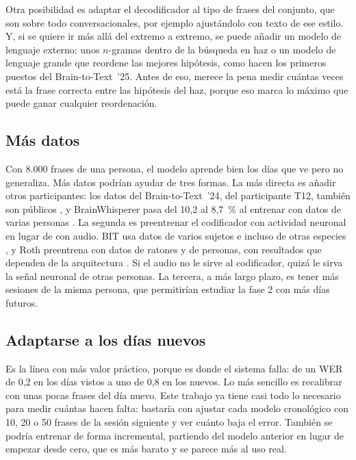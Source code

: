 Otra posibilidad es adaptar el decodificador al tipo de frases del conjunto, que son sobre todo conversacionales, por ejemplo ajustándolo con texto de ese estilo. Y, si se quiere ir más allá del extremo a extremo, se puede añadir un modelo de lenguaje externo: unos $n$-gramas dentro de la búsqueda en haz o un modelo de lenguaje grande que reordene las mejores hipótesis, como hacen los primeros puestos del Brain-to-Text~'25. Antes de eso, merece la pena medir cuántas veces está la frase correcta entre las hipótesis del haz, porque eso marca lo máximo que puede ganar cualquier reordenación.

\subsection{Más datos}

Con 8.000 frases de una persona, el modelo aprende bien los días que ve pero no generaliza. Más datos podrían ayudar de tres formas. La más directa es añadir otros participantes: los datos del Brain-to-Text~'24, del participante T12, también son públicos \cite{willett2023,b2t24lessons}, y BrainWhisperer pasa del 10,2 al 8,7~\% al entrenar con datos de varias personas \cite{brainwhisperer}. La segunda es preentrenar el codificador con actividad neuronal en lugar de con audio. BIT usa datos de varios sujetos e incluso de otras especies \cite{crossspecies2025}, y Roth preentrena con datos de ratones y de personas, con resultados que dependen de la arquitectura \cite{roth2026}. Si el audio no le sirve al codificador, quizá le sirva la señal neuronal de otras personas. La tercera, a más largo plazo, es tener más sesiones de la misma persona, que permitirían estudiar la fase 2 con más días futuros.

\subsection{Adaptarse a los días nuevos}
\label{sec:futuro-dias-nuevos}

Es la línea con más valor práctico, porque es donde el sistema falla: de un WER de 0,2 en los días vistos a uno de 0,8 en los nuevos. Lo más sencillo es recalibrar con unas pocas frases del día nuevo. Este trabajo ya tiene casi todo lo necesario para medir cuántas hacen falta: bastaría con ajustar cada modelo cronológico con 10, 20 o 50 frases de la sesión siguiente y ver cuánto baja el error. También se podría entrenar de forma incremental, partiendo del modelo anterior en lugar de empezar desde cero, que es más barato y se parece más al uso real.

